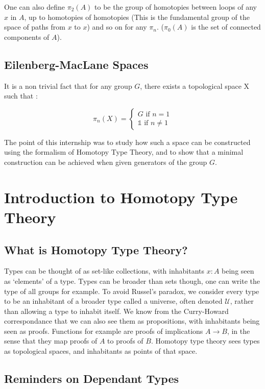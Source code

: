 \documentclass{article}
\begin{document}
One can also define $\pi_{2}(A)$ to be the group of homotopies between loops of any $x$ in $A$, up to homotopies of homotopies (This is the fundamental group of the space of paths from $x$ to $x$) and so on for any $\pi_{n}$. ($\pi_{0}(A)$ is the set of connected components of $A$).

\subsection{Eilenberg-MacLane Spaces}

It is a non trivial fact that for any group $G$, there exists a topological space X such that :

\[
\pi_{n}(X) =
\begin{cases}
  G \text{ if } n = 1 \\
  \mathbb{1} \text{ if } n \neq 1
\end{cases}
\]

The point of this internship was to study how such a space can be constructed using the formalism of Homotopy Type Theory, and to show that a minimal construction can be achieved when given generators of the group $G$.

\section{Introduction to Homotopy Type Theory}

\subsection{What is Homotopy Type Theory?}

Types can be thought of as set-like collections, with inhabitants $x : A$ being seen as `elements' of a type. Types can be broader than sets though, one can write the type of all groups for example. To avoid Russel's paradox, we consider every type to be an inhabitant of a broader type called a universe, often denoted $\mathcal{U}$, rather than allowing a type to inhabit itself. We know from the Curry-Howard correspondance that we can also see them as propositions, with inhabitants being seen as proofs. Functions for example are proofs of implications $A \to B$, in the sense that they map proofs of $A$ to proofs of $B$. Homotopy type theory sees types as topological spaces, and inhabitants as points of that space.


\subsection{Reminders on Dependant Types}
\end{document}
